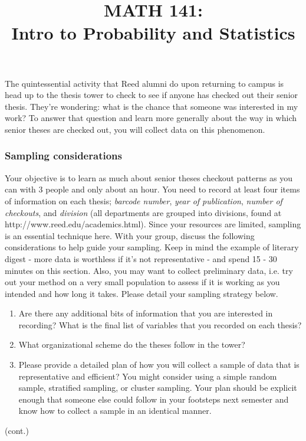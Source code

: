 \documentclass[10pt]{article}\usepackage[]{graphicx}\usepackage[]{color}
\title{MATH 141:\\Intro to Probability and Statistics}
\begin{document}
The quintessential activity that Reed alumni do upon returning to campus is head up to the thesis tower to check to see if anyone has checked out their senior thesis. They're wondering: what is the chance that someone was interested in my work? To answer that question and learn more generally about the way in which senior theses are checked out, you will collect data on this phenomenon.

\subsubsection*{Sampling considerations}
Your objective is to learn as much about senior theses checkout patterns as you can with 3 people and only about an hour. You need to record at least four items of information on each thesis; \emph{barcode number},  \emph{year of publication}, \emph{number of checkouts}, and \emph{division} (all departments are grouped into divisions, found at http://www.reed.edu/academics.html). Since your resources are limited, sampling is an essential technique here. With your group, discuss the following considerations to help guide your sampling. Keep in mind the example of literary digest - more data is worthless if it's not representative - and spend 15 - 30 minutes on this section. Also, you may want to collect preliminary data, i.e. try out your method on a very small population to assess if it is working as you intended and how long it takes. Please detail your sampling strategy below.

\begin{enumerate}
\item  Are there any additional bits of information that you are interested in recording? What is the final list of variables that you recorded on each thesis?
\vspace{20mm}
\item What organizational scheme do the theses follow in the tower?
\vspace{20mm}
\item Please provide a detailed plan of how  you will collect a sample of data that is representative and efficient? You might consider using a simple random sample, stratified sampling, or cluster sampling. Your plan should be explicit enough that someone else could follow in your footsteps next semester and know how to collect a sample in an identical manner.
\end{enumerate}

\newpage

(cont.)
\end{document}
